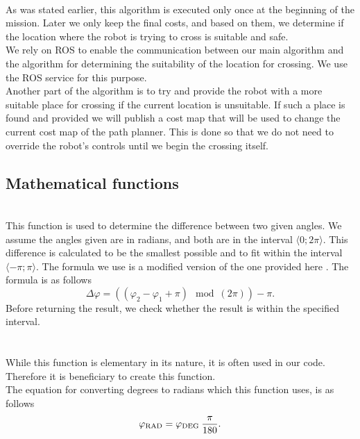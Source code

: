         \\
            As was stated earlier, this algorithm is executed only once at the beginning of the mission. Later we only keep the final costs, and based on them, we determine if the location where the robot is trying to cross is suitable and safe.\\
            We rely on ROS to enable the communication between our main algorithm and the algorithm for determining the suitability of the location for crossing. We use the ROS service for this purpose.\\
            Another part of the algorithm is to try and provide the robot with a more suitable place for crossing if the current location is unsuitable. If such a place is found and provided we will publish a cost map that will be used to change the current cost map of the path planner. This is done so that we do not need to override the robot's controls until we begin the crossing itself.

    \subsection{Mathematical functions}
        \\
            This function is used to determine the difference between two given angles. We assume the angles given are in radians, and both are in the interval $\langle0;2\pi\rangle$. This difference is calculated to be the smallest possible and to fit within the interval $\langle-\pi;\pi\rangle$. The formula we use is a modified version of the one provided here \cite{calc_rotation}. The formula is as follows
            \begin{equation}
                \Delta\varphi = \left((\varphi_{2} - \varphi_{1} + \pi) \mod (2\pi)\right) - \pi.
            \end{equation}
            Before returning the result, we check whether the result is within the specified interval.\\\\
        \\
            While this function is elementary in its nature, it is often used in our code. Therefore it is beneficiary to create this function.\\
            The equation for converting degrees to radians which this function uses, is as follows
            \begin{equation}
                \varphi_{\rm{RAD}} = \varphi_{\rm{DEG}}\:\frac{\pi}{180}.
            \end{equation}

